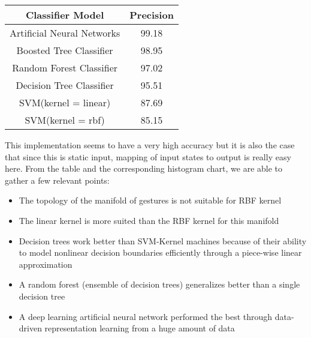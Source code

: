 \begin{table}[!h]
\begin{center}
\begin{tabular}{| c | c |}
\hline
\textbf{Classifier Model} & \textbf{Precision} \\
\hline
Artificial Neural Networks & 99.18 \\ \hline
Boosted Tree Classifier & 98.95 \\ \hline
Random Forest Classifier & 97.02 \\ \hline
Decision Tree Classifier & 95.51 \\ \hline
SVM(kernel = linear) & 87.69 \\ \hline
SVM(kernel = rbf) & 85.15 \\ \hline
\end{tabular}
\end{center}
\end{table}
This implementation seems to have a very high accuracy but it is also the case that since this is static input, mapping of input states to output is really easy here.
From the table and the corresponding histogram chart, we are able to gather a few relevant points:
\begin{itemize}
\item The topology of the manifold of gestures is not suitable for RBF kernel
\item The linear kernel is more suited than the RBF kernel for this manifold
\item Decision trees work better than SVM-Kernel  machines because of their ability to model nonlinear decision boundaries efficiently through a piece-wise linear approximation
\item A random forest (ensemble of decision trees) generalizes better than a single decision tree
\item A deep learning artificial neural network performed the best through data-driven representation learning from a huge amount of data
\end{itemize}

